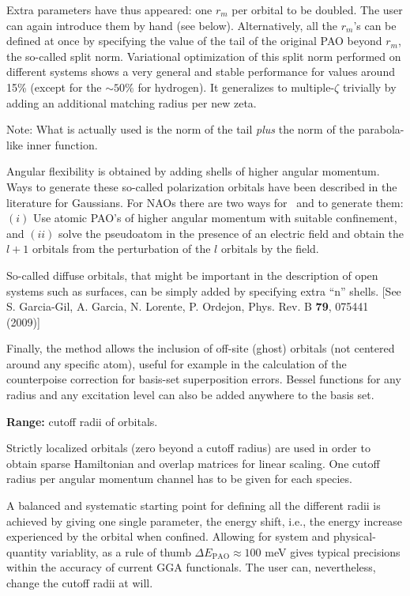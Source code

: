   Extra parameters have thus appeared: one $r_m$ per orbital to be doubled.
The user can again introduce them by hand (see  below).
Alternatively, all the $r_m$'s can be defined at once by specifying
the value of the tail of the original PAO beyond $r_m$, the so-called
split norm. Variational optimization
of this split norm performed on different systems
shows a very general and stable performance for values around
15\% (except for the $\sim 50\%$ for hydrogen).
  It generalizes to multiple-$\zeta$ trivially by adding an additional
matching radius per new zeta.

Note: What is actually used is the norm of the tail \emph{plus} the
norm of the parabola-like inner function.

Angular flexibility is obtained by adding shells of higher angular
momentum.  Ways to generate these so-called polarization orbitals have
been described in the literature for Gaussians.  For NAOs there are
two ways for \siesta\ and  to generate them: $(i)$
Use atomic PAO's of higher angular momentum with suitable confinement,
and $(ii)$ solve the pseudoatom in the presence of an electric field
and obtain the $l+1$ orbitals from the perturbation of the $l$
orbitals by the field.

So-called diffuse orbitals, that might be important in the description
of open systems such as surfaces, can be simply added by specifying
extra ``n'' shells. [See S. Garcia-Gil, A. Garcia, N. Lorente,
  P. Ordejon, Phys. Rev. B \textbf{79}, 075441 (2009)]

Finally, the method allows the inclusion of off-site (ghost) orbitals
(not centered around any specific atom), useful for example in the
calculation of the counterpoise correction for basis-set superposition
errors.  Bessel functions for any radius and any excitation level can
also be added anywhere to the basis set.

\textbf{Range:} cutoff radii of orbitals.

Strictly localized orbitals (zero beyond a cutoff radius) are used in
order to obtain sparse Hamiltonian and overlap matrices for linear
scaling. One cutoff radius per angular momentum channel has to be
given for each species.

A balanced and systematic starting point for defining all the
different radii is achieved by giving one single parameter, the energy
shift, i.e., the energy increase experienced by the orbital when confined.
Allowing for system and physical-quantity variablity, as a rule of
thumb $\Delta E_{\mathrm{PAO}} \approx 100$ meV gives typical
precisions within the accuracy of current GGA functionals.  The user
can, nevertheless, change the cutoff radii at will.

